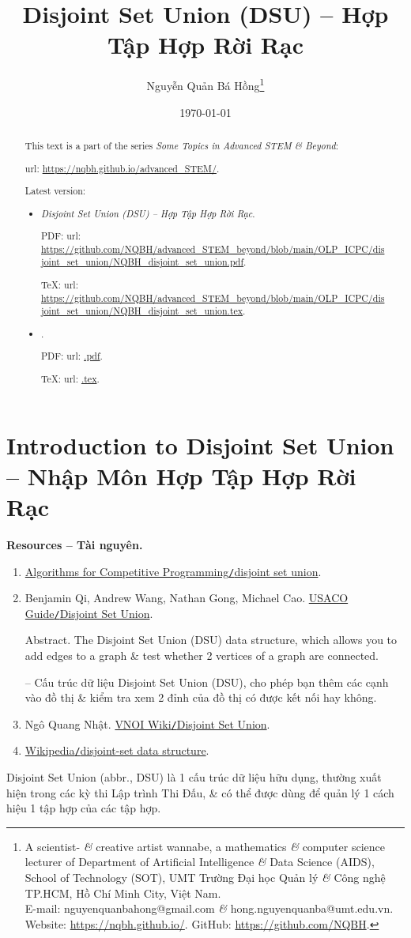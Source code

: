 \documentclass{article}
\title{Disjoint Set Union (DSU) -- Hợp Tập Hợp Rời Rạc}
\author{Nguyễn Quản Bá Hồng\footnote{A scientist- {\it\&} creative artist wannabe, a mathematics {\it\&} computer science lecturer of Department of Artificial Intelligence {\it\&} Data Science (AIDS), School of Technology (SOT), UMT Trường Đại học Quản lý {\it\&} Công nghệ TP.HCM, Hồ Chí Minh City, Việt Nam.\\E-mail: {\sf nguyenquanbahong@gmail.com} {\it\&} {\sf hong.nguyenquanba@umt.edu.vn}. Website: \url{https://nqbh.github.io/}. GitHub: \url{https://github.com/NQBH}.}}
\date{\today}
\begin{document}
\maketitle
\begin{abstract}
    This text is a part of the series {\it Some Topics in Advanced STEM \& Beyond}:

    {\sc url}: \url{https://nqbh.github.io/advanced_STEM/}.

    Latest version:
    \begin{itemize}
        \item {\it Disjoint Set Union (DSU) -- Hợp Tập Hợp Rời Rạc}.

        PDF: {\sc url}: \url{https://github.com/NQBH/advanced_STEM_beyond/blob/main/OLP_ICPC/disjoint_set_union/NQBH_disjoint_set_union.pdf}.

        \TeX: {\sc url}: \url{https://github.com/NQBH/advanced_STEM_beyond/blob/main/OLP_ICPC/disjoint_set_union/NQBH_disjoint_set_union.tex}.
        \item {\it }.

        PDF: {\sc url}: \url{.pdf}.

        \TeX: {\sc url}: \url{.tex}.
    \end{itemize}
\end{abstract}
\tableofcontents


\section{Introduction to Disjoint Set Union -- Nhập Môn Hợp Tập Hợp Rời Rạc}
\textbf{\textsf{Resources -- Tài nguyên.}}
\begin{enumerate}
    \item \href{https://cp-algorithms.com/data_structures/disjoint_set_union.html}{Algorithms for Competitive Programming{\tt/}disjoint set union}.

    \item {\sc Benjamin Qi, Andrew Wang, Nathan Gong, Michael Cao}. \href{https://usaco.guide/gold/dsu?lang=cpp}{USACO Guide{\tt/}Disjoint Set Union}.

    {\sf Abstract.} The Disjoint Set Union (DSU) data structure, which allows you to add edges to a graph \& test whether 2 vertices of a graph are connected.

    -- Cấu trúc dữ liệu Disjoint Set Union (DSU), cho phép bạn thêm các cạnh vào đồ thị \& kiểm tra xem 2 đỉnh của đồ thị có được kết nối hay không.

    \item {\sc Ngô Quang Nhật}. \href{https://wiki.vnoi.info/algo/data-structures/disjoint-set-union}{VNOI Wiki{\tt/}Disjoint Set Union}.

    \item \href{https://en.wikipedia.org/wiki/Disjoint-set_data_structure}{Wikipedia{\tt/}disjoint-set data structure}.
\end{enumerate}
Disjoint Set Union (abbr., DSU) là 1 cấu trúc dữ liệu hữu dụng, thường xuất hiện trong các kỳ thi Lập trình Thi Đấu, \& có thể được dùng để quản lý 1 cách hiệu 1 tập hợp của các tập hợp.
\end{document}
